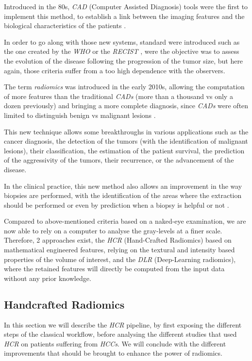 \documentclass[]{article}
\begin{document}
Introduced in the 80s, \emph{CAD} (Computer Assisted Diagnosis) tools
were the first to implement this method, to establish a link between the
imaging features and the biological characteristics of the patients
\cite{Doi2007}.

In order to go along with those new systems, standard were introduced
such as the one created by the \emph{WHO} or the \emph{RECIST}
\cite{Jaffe2006}, were the objective was to assess the
evolution of the disease following the progression of the tumor size,
but here again, those criteria suffer from a too high dependence with
the observers.

The term \emph{radiomics} was introduced in the early 2010s, allowing
the computation of more features than the traditional \emph{CADs} (more
than a thousand vs only a dozen previously) and bringing a more complete
diagnosis, since \emph{CADs} were often limited to distinguish benign vs
malignant lesions \cite{Afshar2018}.

This new technique allows some breakthroughs in various applications
such as the cancer diagnosis, the detection of the tumors (with the
identification of malignant lesions), their classification, the
estimation of the patient survival, the prediction of the aggressivity
of the tumors, their recurrence, or the advancement of the disease.

In the clinical practice, this new method also allows an improvement in
the way biopsies are performed, with the identification of the areas
where the extraction should be performed \cite{Gillies2016}
or even by prediction when a biopsy is helpful or not \cite{Liu2016}.

Compared to above-mentioned criteria based on a naked-eye examination,
we are now able to rely on a computer to analyse the gray-levels at a
finer scale. Therefore, 2 approaches exist, the \emph{HCR} (Hand-Crafted
Radiomics) based on mathematical engineered features, relying on the
textural and intensity based properties of the volume of interest, and
the \emph{DLR} (Deep-Learning radiomics), where the retained features
will directly be computed from the input data without any prior
knowledge.

\subsection{Handcrafted Radiomics }\label{handcrafted-radiomics}

In this section we will describe the \emph{HCR} pipeline, by first
exposing the different steps of the classical workflow, before analysing
the different studies that used \emph{HCR} on patients suffering from
\emph{HCCs}. We will conclude with the different improvements that
should be brought to enhance the power of radiomics.
\end{document}

